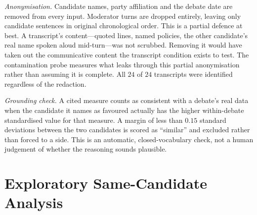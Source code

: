 \documentclass[pdflatex,sn-mathphys-num]{sn-jnl}%
\begin{document}
\begin{appendices}
\emph{Anonymisation.} Candidate names, party affiliation and the debate
date are removed from every input. Moderator turns are dropped entirely,
leaving only candidate sentences in original chronological order. This is
a partial defence at best. A transcript's content---quoted lines, named
policies, the other candidate's real name spoken aloud mid-turn---was not
scrubbed. Removing it would have taken out the communicative content the
transcript condition exists to test. The contamination probe measures what
leaks through this partial anonymisation rather than assuming it is
complete. All $24$ of $24$ transcripts were identified regardless of the
redaction.

\emph{Grounding check.} A cited measure counts as consistent with a
debate's real data when the candidate it names as favoured actually has
the higher within-debate standardised value for that measure. A margin of
less than $0.15$ standard deviations between the two candidates is scored
as ``similar'' and excluded rather than forced to a side. This is an
automatic, closed-vocabulary check, not a human judgement of whether the
reasoning sounds plausible.

\section{Exploratory Same-Candidate Analysis}
\label{app:samecand}


\end{appendices}
\end{document}
